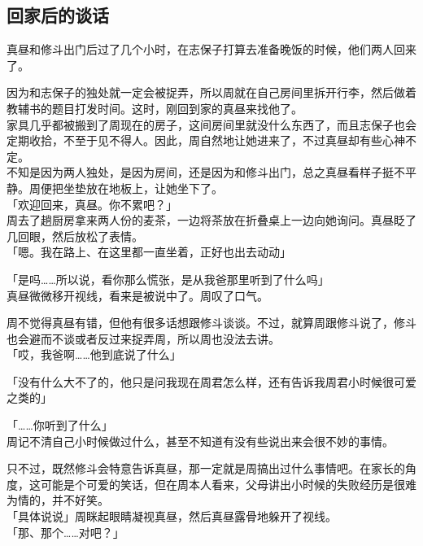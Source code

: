 \subsection{回家后的谈话}

真昼和修斗出门后过了几个小时，在志保子打算去准备晚饭的时候，他们两人回来了。

因为和志保子的独处就一定会被捉弄，所以周就在自己房间里拆开行李，然后做着教辅书的题目打发时间。这时，刚回到家的真昼来找他了。\\

家具几乎都被搬到了周现在的房子，这间房间里就没什么东西了，而且志保子也会定期收拾，不至于见不得人。因此，周自然地让她进来了，不过真昼却有些心神不定。\\

不知是因为两人独处，是因为房间，还是因为和修斗出门，总之真昼看样子挺不平静。周便把坐垫放在地板上，让她坐下了。\\

「欢迎回来，真昼。你不累吧？」\\

周去了趟厨房拿来两人份的麦茶，一边将茶放在折叠桌上一边向她询问。真昼眨了几回眼，然后放松了表情。\\

「嗯。我在路上、在这里都一直坐着，正好也出去动动」

「是吗……所以说，看你那么慌张，是从我爸那里听到了什么吗」\\

真昼微微移开视线，看来是被说中了。周叹了口气。

周不觉得真昼有错，但他有很多话想跟修斗谈谈。不过，就算周跟修斗说了，修斗也会避而不谈或者反过来捉弄周，所以周也没法去讲。\\

「哎，我爸啊……他到底说了什么」

「没有什么大不了的，他只是问我现在周君怎么样，还有告诉我周君小时候很可爱之类的」

「……你听到了什么」\\

周记不清自己小时候做过什么，甚至不知道有没有些说出来会很不妙的事情。

只不过，既然修斗会特意告诉真昼，那一定就是周搞出过什么事情吧。在家长的角度，这可能是个可爱的笑话，但在周本人看来，父母讲出小时候的失败经历是很难为情的，并不好笑。\\

「具体说说」周眯起眼睛凝视真昼，然后真昼露骨地躲开了视线。\\

「那、那个……对吧？」

